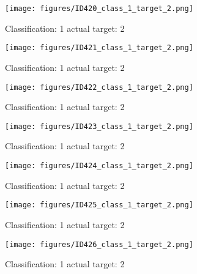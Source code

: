 \begin{figure}[h!]
\begin{center}
\texttt{[image: figures/ID420\_class\_1\_target\_2.png]}
\end{center}
\caption{ Classification: 1 actual target: 2}
\label{fig:ID420_class_1_target_2}
\end{figure}
\begin{figure}[h!]
\begin{center}
\texttt{[image: figures/ID421\_class\_1\_target\_2.png]}
\end{center}
\caption{ Classification: 1 actual target: 2}
\label{fig:ID421_class_1_target_2}
\end{figure}
\begin{figure}[h!]
\begin{center}
\texttt{[image: figures/ID422\_class\_1\_target\_2.png]}
\end{center}
\caption{ Classification: 1 actual target: 2}
\label{fig:ID422_class_1_target_2}
\end{figure}
\begin{figure}[h!]
\begin{center}
\texttt{[image: figures/ID423\_class\_1\_target\_2.png]}
\end{center}
\caption{ Classification: 1 actual target: 2}
\label{fig:ID423_class_1_target_2}
\end{figure}
\begin{figure}[h!]
\begin{center}
\texttt{[image: figures/ID424\_class\_1\_target\_2.png]}
\end{center}
\caption{ Classification: 1 actual target: 2}
\label{fig:ID424_class_1_target_2}
\end{figure}
\begin{figure}[h!]
\begin{center}
\texttt{[image: figures/ID425\_class\_1\_target\_2.png]}
\end{center}
\caption{ Classification: 1 actual target: 2}
\label{fig:ID425_class_1_target_2}
\end{figure}
\begin{figure}[h!]
\begin{center}
\texttt{[image: figures/ID426\_class\_1\_target\_2.png]}
\end{center}
\caption{ Classification: 1 actual target: 2}
\label{fig:ID426_class_1_target_2}
\end{figure}

